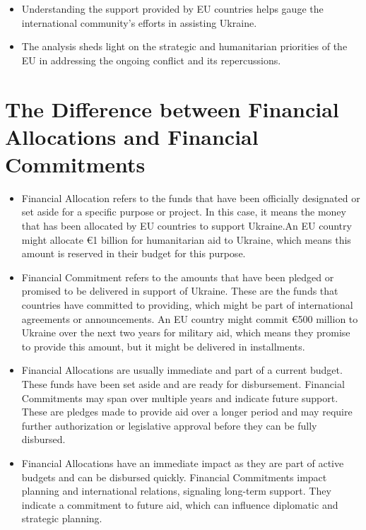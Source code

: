 \documentclass[12pt,preprint, authoryear]{elsarticle}
\numberwithin{equation}{section}
\numberwithin{figure}{section}
\numberwithin{table}{section}
\def\tightlist{} %
\begin{document}
\begin{itemize}
  \begin{itemize}
  \tightlist
  \item
    Understanding the support provided by EU countries helps gauge the
    international community's efforts in assisting Ukraine.
  \item
    The analysis sheds light on the strategic and humanitarian
    priorities of the EU in addressing the ongoing conflict and its
    repercussions.
  \end{itemize}
\end{itemize}

\hypertarget{the-difference-between-financial-allocations-and-financial-commitments}{%
\section{The Difference between Financial Allocations and Financial
Commitments}\label{the-difference-between-financial-allocations-and-financial-commitments}}

\begin{itemize}
\item
  Financial Allocation refers to the funds that have been officially
  designated or set aside for a specific purpose or project. In this
  case, it means the money that has been allocated by EU countries to
  support Ukraine.An EU country might allocate €1 billion for
  humanitarian aid to Ukraine, which means this amount is reserved in
  their budget for this purpose.
\item
  Financial Commitment refers to the amounts that have been pledged or
  promised to be delivered in support of Ukraine. These are the funds
  that countries have committed to providing, which might be part of
  international agreements or announcements. An EU country might commit
  €500 million to Ukraine over the next two years for military aid,
  which means they promise to provide this amount, but it might be
  delivered in installments.
\item
  Financial Allocations are usually immediate and part of a current
  budget. These funds have been set aside and are ready for
  disbursement. Financial Commitments may span over multiple years and
  indicate future support. These are pledges made to provide aid over a
  longer period and may require further authorization or legislative
  approval before they can be fully disbursed.
\item
  Financial Allocations have an immediate impact as they are part of
  active budgets and can be disbursed quickly. Financial Commitments
  impact planning and international relations, signaling long-term
  support. They indicate a commitment to future aid, which can influence
  diplomatic and strategic planning.
\end{itemize}
\end{document}
